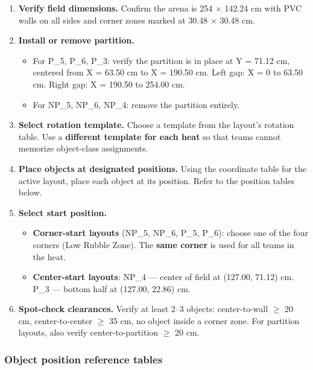\documentclass[a4]{article}
\begin{document}
\begin{enumerate}
    \item \textbf{Verify field dimensions.} Confirm the arena is 254 $\times$ 142.24 cm with PVC walls on all sides and corner zones marked at 30.48 $\times$ 30.48 cm.

    \item \textbf{Install or remove partition.}
    \begin{itemize}
        \item For P\_5, P\_6, P\_3: verify the partition is in place at Y = 71.12 cm, centered from X = 63.50 cm to X = 190.50 cm. Left gap: X = 0 to 63.50 cm. Right gap: X = 190.50 to 254.00 cm.
        \item For NP\_5, NP\_6, NP\_4: remove the partition entirely.
    \end{itemize}

    \item \textbf{Select rotation template.} Choose a template from the layout's rotation table. Use a \textbf{different template for each heat} so that teams cannot memorize object-class assignments.

    \item \textbf{Place objects at designated positions.} Using the coordinate table for the active layout, place each object at its position. Refer to the position tables below.

    \item \textbf{Select start position.}
    \begin{itemize}
        \item \textbf{Corner-start layouts} (NP\_5, NP\_6, P\_5, P\_6): choose one of the four corners (Low Rubble Zone). The \textbf{same corner} is used for all teams in the heat.
        \item \textbf{Center-start layouts}: NP\_4 --- center of field at (127.00, 71.12) cm. P\_3 --- bottom half at (127.00, 22.86) cm.
    \end{itemize}

    \item \textbf{Spot-check clearances.} Verify at least 2--3 objects: center-to-wall $\geq$ 20 cm, center-to-center $\geq$ 35 cm, no object inside a corner zone. For partition layouts, also verify center-to-partition $\geq$ 20 cm.
\end{enumerate}

\subsubsection*{Object position reference tables}
\end{document}
